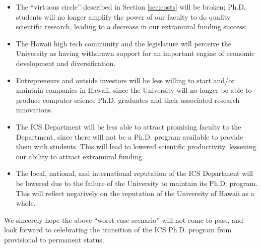 \documentclass[12pt]{article}
\begin{document}
\begin{itemize}

\item The ``virtuous circle'' described in Section \ref{sec:costs} will be
  broken; Ph.D. students will no longer amplify the power of our faculty
  to do quality scientific research, leading to a decrease in our extramural
  funding success;

\item The Hawaii high tech community and the legislature will perceive the
  University as having withdrawn support for an important engine of
  economic development and diversification.

\item Entrepreneurs and outside investors will be less willing to start
  and/or maintain companies in Hawaii, since the University will no longer
  be able to produce computer science Ph.D. graduates and their associated
  research innovations.

\item The ICS Department will be less able to attract promising faculty to
  the Department, since there will not be a Ph.D. program available to
  provide them with students.  This will lead to lowered scientific
  productivity, lessening our ability to attract extramural funding.

\item The local, national, and international reputation of the ICS
  Department will be lowered due to the failure of the University to
  maintain its Ph.D. program.  This will reflect negatively on the
  reputation of the University of Hawaii as a whole.

\end{itemize}

We sincerely hope the above ``worst case scenario'' will not come to pass,
and look forward to celebrating the transition of the ICS Ph.D. program
from provisional to permanent status. 
\end{document}
